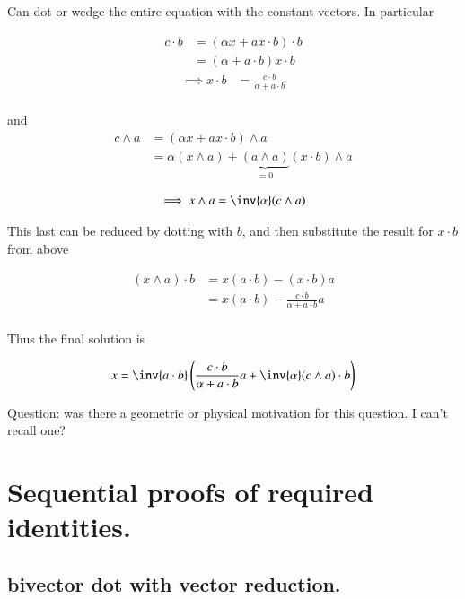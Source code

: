 \documentclass{article}
\begin{document}
Can dot or wedge the entire equation with the constant vectors.  In particular

\begin{align*}
c \cdot b &= (\alpha x + a x \cdot b) \cdot b \\ 
&= (\alpha + a \cdot b) x \cdot b 
\end{align*}
\begin{align*}
\implies
x \cdot b &= \frac{c \cdot b}{\alpha + a \cdot b} \\
\end{align*}

and
\begin{align*}
c \wedge a &= (\alpha x + a x \cdot b) \wedge a \\ 
&= \alpha (x \wedge a) + \underbrace{(a \wedge a)}_{=0} (x \cdot b) \wedge a \\
\end{align*}
\begin{align*}
\implies
x \wedge a &= \inv{\alpha} (c \wedge a) \\
\end{align*}

This last can be reduced by dotting with $b$, and then substitute the 
result for $x \cdot b$ from above

\begin{align*}
(x \wedge a) \cdot b
&= x (a \cdot b) - (x \cdot b) a \\
&= x (a \cdot b) - \frac{c \cdot b}{\alpha + a \cdot b} a \\
\end{align*}

Thus the final solution is

\begin{align*}
x = \inv{a \cdot b}\left(
\frac{c \cdot b}{\alpha + a \cdot b} a 
+ \inv{\alpha} (c \wedge a) \cdot b
\right)
\end{align*}

Question: was there a geometric or physical motivation for this question.  I can't recall one?

\section{ Sequential proofs of required identities. }

\subsection{ bivector dot with vector reduction. }
\end{document}
